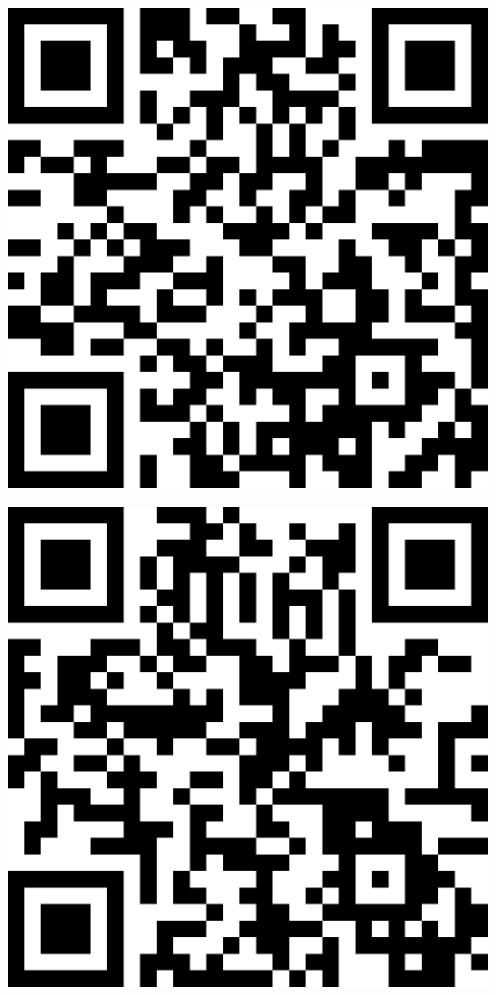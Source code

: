 \documentclass[letterpaper]{article}
\begin{document}
 \endgroup 
 \vspace*{\fill} 
 \pagebreak 
{} 
 \vspace*{\fill} 
 \begingroup 
 \centerline{\includegraphics[scale=1,width=5in,height=5in]{CompStudiesLab.png}} 
 \endgroup 
 \vspace*{\fill} 
 \pagebreak 
{} 
 \vspace*{\fill} 
 \begingroup 
 \centerline{\includegraphics[scale=1,width=5in,height=5in]{ComputerVisionLab.png}} 
\end{document}
